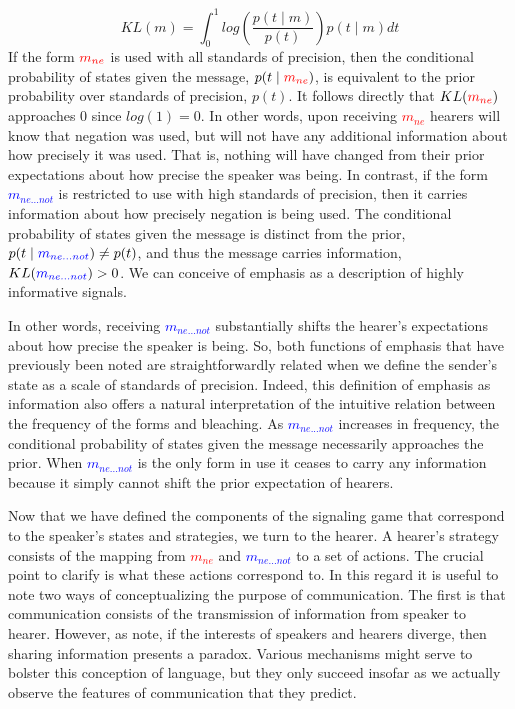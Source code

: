 \documentclass[linguex]{sp}
\theoremstyle{definition} \newtheorem{definition}{Definition}
\begin{document}
\begin{equation}
     KL( m ) = \int_0^1 log\left( \frac{p(t \mid m )}{p(t)}  \right)p(t \mid m ) dt
\end{equation}
If the form $\textcolor{red}{m_{ne}}$ is used with all standards of precision, then the conditional probability of states given the message, $p(t \mid \textcolor{red}{m_{ne}})$, is equivalent to the prior probability over standards of precision, $p(t)$. It follows directly that $KL(\textcolor{red}{m_{ne}})$ approaches $0$ since $log(1) = 0$. In other words, upon receiving \textcolor{red}{$m_{ne}$} hearers will know that negation was used, but will not have any additional information about how precisely it was used. That is, nothing will have changed from their prior expectations about how precise the speaker was being. In contrast, if the form \textcolor{blue}{$m_{ne...not}$} is restricted to use with high standards of precision, then it carries information about how precisely negation is being used. The conditional probability of states given the message is distinct from the prior, $p(t \mid \textcolor{blue}{m_{ne...not}}) \neq p(t)$, and thus the message carries information, $KL(\textcolor{blue}{m_{ne...not}}) > 0$.  We can conceive of emphasis as a description of highly informative signals.

In other words, receiving \textcolor{blue}{$m_{ne...not}$} substantially shifts the hearer's expectations about how precise the speaker is being.  So, both functions of emphasis that have previously been noted are straightforwardly related when we define the sender's state as a scale of standards of precision. Indeed, this definition of emphasis as information also offers a natural interpretation of the intuitive relation between the frequency of the forms and bleaching. As \textcolor{blue}{$m_{ne...not}$} increases in frequency, the conditional probability of states given the message necessarily approaches the prior. When \textcolor{blue}{$m_{ne...not}$} is the only form in use it ceases to carry any information because it simply cannot shift the prior expectation of hearers.

Now that we have defined the components of the signaling game that correspond to the speaker's states and strategies, we turn to the hearer. A hearer's strategy consists of the mapping from \textcolor{red}{$m_{ne}$} and \emph{\textcolor{blue}{$m_{ne...not}$}} to a set of actions. The crucial point to clarify is what these actions correspond to. In this regard it is useful to note two ways of conceptualizing the purpose of communication. The first is that communication consists of the transmission of information from speaker to hearer. However, as  \cite{franke-etal:2012} note,  if the interests of speakers and hearers diverge, then sharing information presents a paradox. Various mechanisms might serve to bolster this conception of language, but they only succeed insofar as we actually observe the features of communication that they predict.
\end{document}
